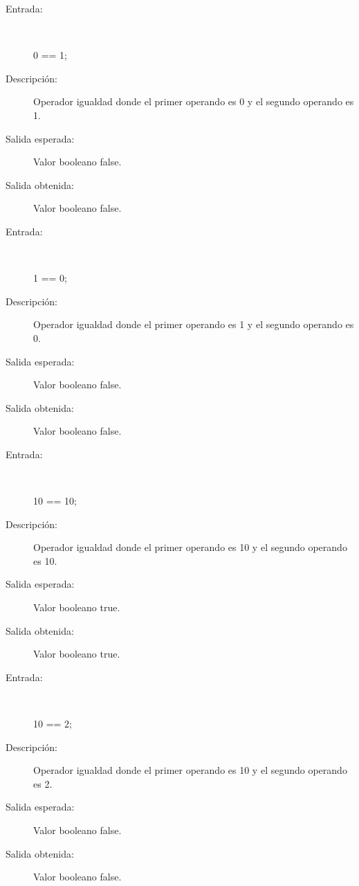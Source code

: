 	\begin{description}
		\item [Entrada:] \hfill \\
\begin{myverbatim}
 0 == 1;
\end{myverbatim}
		\item [Descripción:] Operador igualdad donde el primer operando es 0 y el segundo operando es  1.
		\item [Salida esperada:] Valor booleano false.
		\item [Salida obtenida:] Valor booleano false.
	\end{description}

	\begin{description}
		\item [Entrada:] \hfill \\
\begin{myverbatim}
 1 == 0;
\end{myverbatim}
		\item [Descripción:] Operador igualdad donde el primer operando es 1 y el segundo operando es  0.
		\item [Salida esperada:] Valor booleano false.
		\item [Salida obtenida:] Valor booleano false.
	\end{description}

	\begin{description}
		\item [Entrada:] \hfill \\
\begin{myverbatim}
 10 == 10;
\end{myverbatim}
		\item [Descripción:] Operador igualdad donde el primer operando es 10 y el segundo operando es  10.
		\item [Salida esperada:] Valor booleano true.
		\item [Salida obtenida:] Valor booleano true.
	\end{description}

	\begin{description}
		\item [Entrada:] \hfill \\
\begin{myverbatim}
 10 == 2;
\end{myverbatim}
		\item [Descripción:] Operador igualdad donde el primer operando es 10 y el segundo operando es  2.
		\item [Salida esperada:] Valor booleano false.
		\item [Salida obtenida:] Valor booleano false.
	\end{description}

